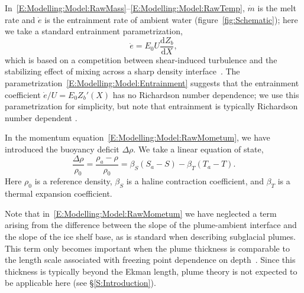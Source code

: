 \documentclass[openacc]{rsproca_new}%
\newcommand{\dd}[2]{\frac{\mathrm{d} #1}{\mathrm{d} #2}}
\begin{document}
In~\eqref{E:Modelling:Model:RawMass}--\eqref{E:Modelling:Model:RawTemp}, $\dot{m}$ is the melt rate and $\dot{e}$ is the entrainment rate of ambient water (figure~\ref{fig:Schematic}); here we take a standard entrainment parametrization, 
\begin{equation}\label{E:Modelling:Model:Entrainment}
\dot{e} = E_0 U \dd{Z_b}{X},
\end{equation}
which is based on a competition between shear-induced turbulence and the stabilizing effect of mixing across a sharp density interface~\citep{Pedersen1980,Turner1986JFM}. The parametrization~\eqref{E:Modelling:Model:Entrainment} suggests that the entrainment coefficient $\dot{e}/U = E_0 Z_b'(X)$ has no Richardson number dependence; we use this parametrization for simplicity, but note that entrainment is typically Richardson number dependent \cite[see][for example]{Holland2007JGeophysResOceans}.

In the momentum equation~\eqref{E:Modelling:Model:RawMometum}, we have introduced the buoyancy deficit $\Delta \rho$. We take a linear equation of state,
\begin{equation}\label{E:Modelling:Model:EquationOfState}
\frac{\Delta \rho}{\rho_0}  = \frac{\rho_a - \rho}{\rho_0}= \beta_S(S_a - S) - \beta_T (T_a - T).
\end{equation}
Here $\rho_0$ is a reference density, $\beta_S$ is a haline contraction coefficient, and $\beta_T$ is a thermal expansion coefficient. 

Note that in~\eqref{E:Modelling:Model:RawMometum} we have neglected a term arising from the difference between the slope of the plume-ambient interface and the slope of the ice shelf base, as is standard when describing subglacial plumes. This term only becomes important when the plume thickness is comparable to the length scale associated with freezing point dependence on depth~\citep{Jenkins2011JPhysOcean}. Since this thickness is typically beyond the Ekman length, plume theory is not expected to be applicable here (see \S\ref{S:Introduction}).
\end{document}

